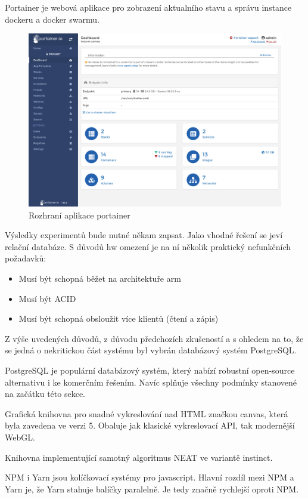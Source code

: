 Portainer je webová aplikace pro zobrazení aktualního stavu a správu instance dockeru a docker swarmu.

\begin{figure}[H]
	\centering
	\includegraphics[width=0.7\linewidth]{portainer}
	\caption{Rozhraní aplikace portainer}
	\label{fig:portainer}
\end{figure}


Výsledky experimentů bude nutné někam zapsat. Jako vhodné řešení se jeví relační databáze. S důvodů hw omezení je na ní několik praktický nefunkčních požadavků:
\begin{itemize}
	\item Musí být schopná běžet na architektuře arm
	\item Musí být ACID
	\item Musí být schopná obsloužit více klientů (čtení a zápis)
\end{itemize}

Z výše uvedených důvodů, z důvodu předchozích zkušeností a s ohledem na to, že se jedná o nekritickou část systému byl vybrán databázový systém PostgreSQL. 

PostgreSQL je populární databázový systém, který nabízí robustní open-source alternativu i ke komerčním řešením. Navíc splňuje všechny podmínky stanovené na začátku této sekce.

Grafická knihovna pro snadné vykreslování nad HTML značkou canvas, která byla zavedena ve verzi 5. Obaluje jak klasické vykreslovací API, tak modernější WebGL.

Knihovna implementující samotný algoritmus NEAT ve variantě instinct.

NPM i Yarn jsou kolíčkovací systémy pro javascript. Hlavní rozdíl mezi NPM a Yarn je, že Yarn stahuje balíčky paralelně. Je tedy značně rychlejší oproti NPM. 

